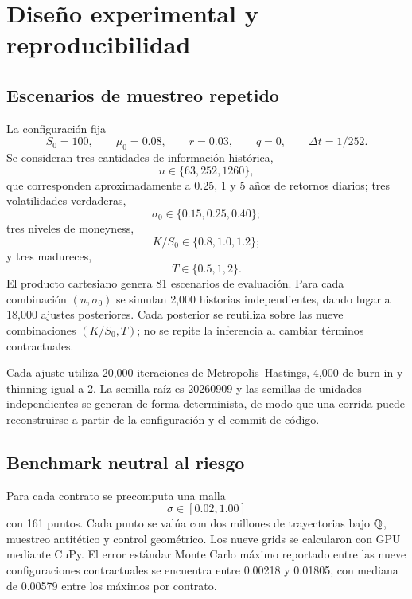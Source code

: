 \section{Diseño experimental y reproducibilidad}

\subsection{Escenarios de muestreo repetido}

La configuración fija
\begin{equation}
 S_0=100,
 \qquad \mu_0=0.08,
 \qquad r=0.03,
 \qquad q=0,
 \qquad \Delta t=1/252.
\end{equation}
Se consideran tres cantidades de información histórica,
\begin{equation}
 n\in\{63,252,1260\},
\end{equation}
que corresponden aproximadamente a 0.25, 1 y 5 años de retornos diarios; tres volatilidades verdaderas,
\begin{equation}
 \sigma_0\in\{0.15,0.25,0.40\};
\end{equation}
tres niveles de moneyness,
\begin{equation}
 K/S_0\in\{0.8,1.0,1.2\};
\end{equation}
y tres madureces,
\begin{equation}
 T\in\{0.5,1,2\}.
\end{equation}
El producto cartesiano genera 81 escenarios de evaluación. Para cada combinación $(n,\sigma_0)$ se simulan 2,000 historias independientes, dando lugar a 18,000 ajustes posteriores. Cada posterior se reutiliza sobre las nueve combinaciones $(K/S_0,T)$; no se repite la inferencia al cambiar términos contractuales.

Cada ajuste utiliza 20,000 iteraciones de Metropolis--Hastings, 4,000 de burn-in y thinning igual a 2. La semilla raíz es 20260909 y las semillas de unidades independientes se generan de forma determinista, de modo que una corrida puede reconstruirse a partir de la configuración y el commit de código.

\subsection{Benchmark neutral al riesgo}

Para cada contrato se precomputa una malla
\begin{equation}
 \sigma\in[0.02,1.00]
\end{equation}
con 161 puntos. Cada punto se valúa con dos millones de trayectorias bajo $\mathbb{Q}$, muestreo antitético y control geométrico. Los nueve grids se calcularon con GPU mediante CuPy. El error estándar Monte Carlo máximo reportado entre las nueve configuraciones contractuales se encuentra entre 0.00218 y 0.01805, con mediana de 0.00579 entre los máximos por contrato.

